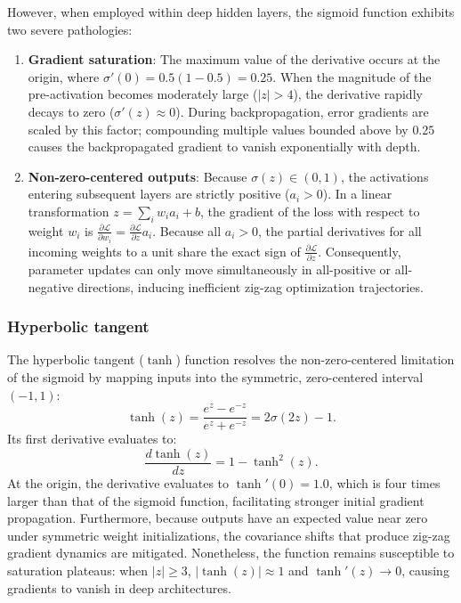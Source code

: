 \documentclass[../../main.tex]{subfiles}
\begin{document}
However, when employed within deep hidden layers, the sigmoid function exhibits two severe pathologies:
\begin{enumerate}[label=(\roman*)]
    \item \textbf{Gradient saturation}: The maximum value of the derivative occurs at the origin, where $\sigma'(0) = 0.5(1 - 0.5) = 0.25$. When the magnitude of the pre-activation becomes moderately large ($|z| > 4$), the derivative rapidly decays to zero ($\sigma'(z) \approx 0$). During backpropagation, error gradients are scaled by this factor; compounding multiple values bounded above by $0.25$ causes the backpropagated gradient to vanish exponentially with depth.
    \item \textbf{Non-zero-centered outputs}: Because $\sigma(z) \in (0, 1)$, the activations entering subsequent layers are strictly positive ($a_i > 0$). In a linear transformation $z = \sum_i w_i a_i + b$, the gradient of the loss with respect to weight $w_i$ is $\frac{\partial \mathcal{L}}{\partial w_i} = \frac{\partial \mathcal{L}}{\partial z} a_i$. Because all $a_i > 0$, the partial derivatives for all incoming weights to a unit share the exact sign of $\frac{\partial \mathcal{L}}{\partial z}$. Consequently, parameter updates can only move simultaneously in all-positive or all-negative directions, inducing inefficient zig-zag optimization trajectories.
\end{enumerate}

\subsubsection{Hyperbolic tangent}

The hyperbolic tangent ($\tanh$) function resolves the non-zero-centered limitation of the sigmoid by mapping inputs into the symmetric, zero-centered interval $(-1, 1)$:
\begin{equation}
\tanh(z) = \frac{e^z - e^{-z}}{e^z + e^{-z}} = 2\sigma(2z) - 1.
\end{equation}
Its first derivative evaluates to:
\begin{equation}
\frac{d\tanh(z)}{dz} = 1 - \tanh^2(z).
\end{equation}
At the origin, the derivative evaluates to $\tanh'(0) = 1.0$, which is four times larger than that of the sigmoid function, facilitating stronger initial gradient propagation. Furthermore, because outputs have an expected value near zero under symmetric weight initializations, the covariance shifts that produce zig-zag gradient dynamics are mitigated. Nonetheless, the function remains susceptible to saturation plateaus: when $|z| \ge 3$, $|\tanh(z)| \approx 1$ and $\tanh'(z) \to 0$, causing gradients to vanish in deep architectures.
\end{document}
